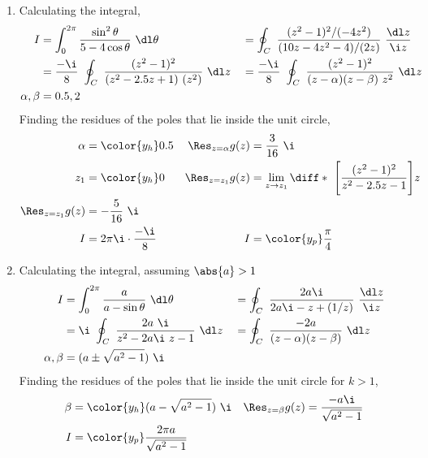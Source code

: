 \begin{enumerate}
    \item Calculating the integral,
          \begin{align}
              I             & = \int_{0}^{2\pi} \frac{\sin^2 \theta}
              {5 - 4\cos\theta} \ \dl \theta
                            &
                            & = \oint_C\ \frac{(z^2 - 1)^2 / (-4z^2)}
              {(10z - 4z^2 - 4) / (2z)} \ \frac{\dl z}{\i z}               \\
                            & = \frac{-\i}{8}\ \oint_C\ \frac{(z^2 - 1)^2}
              {(z^2 - 2.5z + 1)\ (z^2)}
              \ \dl z       &
                            & = \frac{-\i}{8}\ \oint_C\ \frac{(z^2 - 1)^2}
              {(z - \alpha)(z - \beta)\ z^2} \ \dl z                       \\
              \alpha, \beta & = 0.5, 2
          \end{align}
          Finding the residues of the poles that lie inside the unit circle,
          \begin{align}
              \alpha                 & = \color{y_h} 0.5                  &
              \Res_{z = \alpha} g(z) & = \frac{3}{16}\ \i                   \\
              z_1                    & = \color{y_h} 0                    &
              \Res_{z = z_1} g(z)    & = \lim_{z \to z_1} \diff*{\ \Bigg[
              \frac{(z^2 - 1)^2}{z^2 - 2.5z - 1} \Bigg]}{z}                 \\
              \Res_{z = z_1} g(z)    & = -\frac{5}{16}\ \i                  \\
              I                      & = 2\pi\i \cdot \frac{-\i}{8}       &
              I                      & = \color{y_p} \frac{\pi}{4}
          \end{align}

    \item Calculating the integral, assuming $ \abs{a} > 1 $
          \begin{align}
              I             & = \int_{0}^{2\pi} \frac{a}
              {a - \sin\theta} \ \dl \theta
                            &
                            & = \oint_C\ \frac{2a \i}{2a \i - z + (1/z)}
              \ \frac{\dl z}{\i z}                                            \\
                            & = \i\ \oint_C\ \frac{2a\ \i}{z^2 - 2a\i\ z - 1}
              \ \dl z       &
                            & =  \oint_C\ \frac{-2a}
              {(z - \alpha)(z - \beta)} \ \dl z                               \\
              \alpha, \beta & = (a \pm \sqrt{a^2 - 1})\ \i
          \end{align}
          Finding the residues of the poles that lie inside the unit circle for
          $ k > 1 $,
          \begin{align}
              \beta                 & = \color{y_h} (a - \sqrt{a^2 - 1})\ \i      &
              \Res_{z = \beta} g(z) & = \frac{-a\i}{\sqrt{a^2 - 1}}                 \\
              I                     & = \color{y_p} \frac{2\pi a}{\sqrt{a^2 - 1}}
          \end{align}


\end{enumerate}
